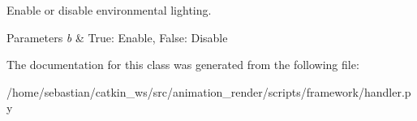 Enable or disable environmental lighting. 


\begin{DoxyParams}{Parameters}
{\em b} & True\+: Enable, False\+: Disable \\
\hline
\end{DoxyParams}


The documentation for this class was generated from the following file\+:\begin{DoxyCompactItemize}
\item 
/home/sebastian/catkin\+\_\+ws/src/animation\+\_\+render/scripts/framework/handler.\+py\end{DoxyCompactItemize}
